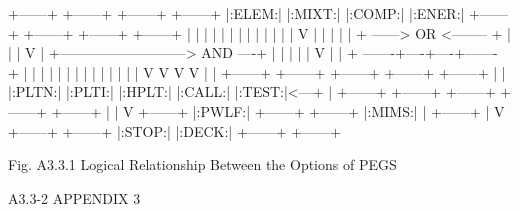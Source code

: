 \newpage {}
\begin{center}
\begin{boxedverbatim}


   +------+    +------+    +------+          +------+
   |:ELEM:|    |:MIXT:|    |:COMP:|          |:ENER:|
   +------+    +------+    +------+          +------+
       |          |           |                  |
       |          |           |                  |
       |          |           |                  |
       |          V           |                  |
       |                      |                  |
       + ------> OR <-------- +                  |
                                                 |
                  |                              V
                  |
                  +---------------------------> AND ----+
                  |                                     |
                  |                              |      |
                  V                              |      |
    + -------+----+----+------- +                |      |
    |        |         |        |                |      |
    |        |         |        |                |      |
    V        V         V        V                |      |
 +------+ +------+ +------+ +------+ +------+    |      |
 |:PLTN:| |:PLTI:| |:HPLT:| |:CALL:| |:TEST:|<---+      |
 +------+ +------+ +------+ +------+ +------+           |
                                                        |
                                                        V
                                                     +------+
                                                     |:PWLF:|
 +------+                                            +------+
 |:MIMS:|                                               |
 +------+                                               |
                                                        V
 +------+                                            +------+
 |:STOP:|                                            |:DECK:|
 +------+                                            +------+





           Fig. A3.3.1  Logical Relationship Between
                       the Options of PEGS



 A3.3-2                                                 APPENDIX 3
\end{boxedverbatim}
\end{center}
